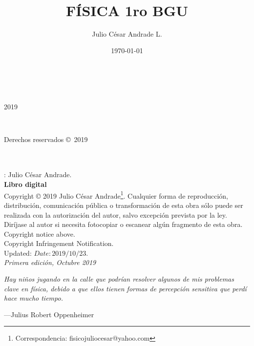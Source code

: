 \documentclass[a5paper,pagesize,10pt,bibtotoc,pointlessnumbers,
normalheadings,DIV=9,fleqn,x11names,table,twoside=false]{scrbook}
\title{FÍSICA 1ro BGU}
\author{Julio César Andrade L.}
\date{\today}
\begin{document}
%

\begin{titlepage}
		\\
			
		\vspace{10mm}
		\\
		\vspace{\fill}
		\centering \large{2019}
\end{titlepage}


\newpage
~\vfill
\thispagestyle{empty}

\noindent 
\parbox[s]{0.35\textwidth}{Derechos reservados \copyright\ 2019}\parbox[c]{0.65\textwidth}{
 \color{gray}
 } \\\\  
 
: Julio César Andrade.\\
\noindent \textbf{Libro digital}\\

\noindent  Copyright © 2019 Julio César Andrade\footnote{Correspondencia: fisicojuliocesar@yahoo.com}. 
Cualquier forma de reproducción, distribución, comunicación pública o transformación de esta obra sólo puede ser realizada con  la 
 autorización  del autor,  salvo  excepción  prevista  por  la  ley.  Diríjase  al autor si  necesita  fotocopiar  o  escanear 
algún fragmento de esta obra.\\

Copyright notice above.\\

Copyright Infringement Notification.\\

Updated: $Date: 2019/10/23$.\\

\noindent \textit{Primera edición, Octubre 2019} 


\newpage{}
\thispagestyle {empty}

\vspace*{2cm}

\begin{center}
	\Large{\parbox{10cm}{
		\begin{raggedright}
		{\Large 
			\textit{Hay niños jugando en la calle que podrían resolver algunos de mis problemas clave en física, 
			debido a que ellos tienen formas de percepción sensitiva que perdí hace mucho tiempo.}
		}
	
		\vspace{.5cm}\hfill{---Julius Robert Oppenheimer}
		\end{raggedright}
	}
}
\end{center}
\end{document}
